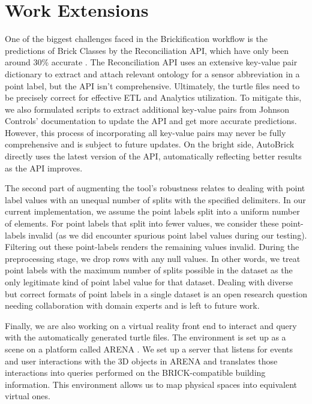 \documentclass[twocolumn, switch]{article} %
\begin{document}
\section{Work Extensions}
One of the biggest challenges faced in the Brickification workflow is the
predictions of Brick Classes by the Reconciliation API, which have only been
around 30\% accurate \cite{gtfierro225_2020}. The Reconciliation API uses an extensive key-value pair dictionary to extract and attach relevant ontology for a sensor abbreviation in a point label, but the API isn’t comprehensive. Ultimately, the turtle files need to be precisely correct for effective ETL and Analytics utilization. To mitigate this, we also formulated scripts to extract additional key-value pairs from Johnson Controls’ documentation to update the API and get more accurate predictions. However, this process of incorporating all key-value pairs may never be fully comprehensive and is subject to future updates. On the bright side, AutoBrick directly uses the latest version of the API, automatically reflecting better results as the API improves. 

	The second part of augmenting the tool’s robustness relates to dealing with point label values with an unequal number of splits with the specified delimiters. In our current implementation, we assume the point labels split into a uniform number of elements. For point labels that split into fewer values, we consider these point-labels invalid (as we did encounter spurious point label values during our testing). Filtering out these point-labels renders the remaining values invalid. During the preprocessing stage, we drop rows with any null values. In other words, we treat point labels with the maximum number of splits possible in the dataset as the only legitimate kind of point label value for that dataset. Dealing with diverse but correct formats of point labels in a single dataset is an open research question needing collaboration with domain experts and is left to future work.

Finally, we are also working on a virtual reality front end to interact and
query with the automatically generated turtle files. The environment is set up
as a scene on a platform called ARENA \cite{conix-center}. We set up a server that listens for
events and user interactions with the 3D objects in ARENA and translates those
interactions into queries performed on the BRICK-compatible building
information. This environment allows us to map physical spaces into equivalent virtual ones.
\end{document}
